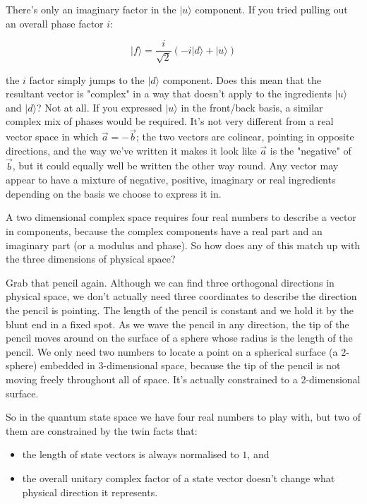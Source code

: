 There's only an imaginary factor in the $|u\rangle$ component. If you tried pulling out an overall phase factor $i$:

$$
|f\rangle = \frac{i}{\sqrt{2}}(-i|d\rangle + |u\rangle)
$$

the $i$ factor simply jumps to the $|d\rangle$ component. Does this mean that the resultant vector is "complex" in a way that doesn't apply to the ingredients $|u\rangle$ and $|d\rangle$? Not at all. If you expressed $|u\rangle$ in the front/back basis, a similar complex mix of phases would be required. It's not very different from a real vector space in which $\vec{a} = -\vec{b}$; the two vectors are colinear, pointing in opposite directions, and the way we've written it makes it look like $\vec{a}$ is the "negative" of $\vec{b}$, but it could equally well be written the other way round. Any vector may appear to have a mixture of negative, positive, imaginary or real ingredients depending on the basis we choose to express it in.

A two dimensional complex space requires four real numbers to describe a vector in components, because the complex components have a real part and an imaginary part (or a modulus and phase). So how does any of this match up with the three dimensions of physical space?

Grab that pencil again. Although we can find three orthogonal directions in physical space, we don't actually need three coordinates to describe the direction the pencil is pointing. The length of the pencil is constant and we hold it by the blunt end in a fixed spot. As we wave the pencil in any direction, the tip of the pencil moves around on the surface of a sphere whose radius is the length of the pencil. We only need two numbers to locate a point on a spherical surface (a $2$-sphere) embedded in 3-dimensional space, because the tip of the pencil is not moving freely throughout all of space. It's actually constrained to a 2-dimensional surface.

So in the quantum state space we have four real numbers to play with, but two of them are constrained by the twin facts that:

\begin{itemize}
  \item the length of state vectors is always normalised to $1$, and
  \item the overall unitary complex factor of a state vector doesn't change what physical direction it represents. 
\end{itemize}

